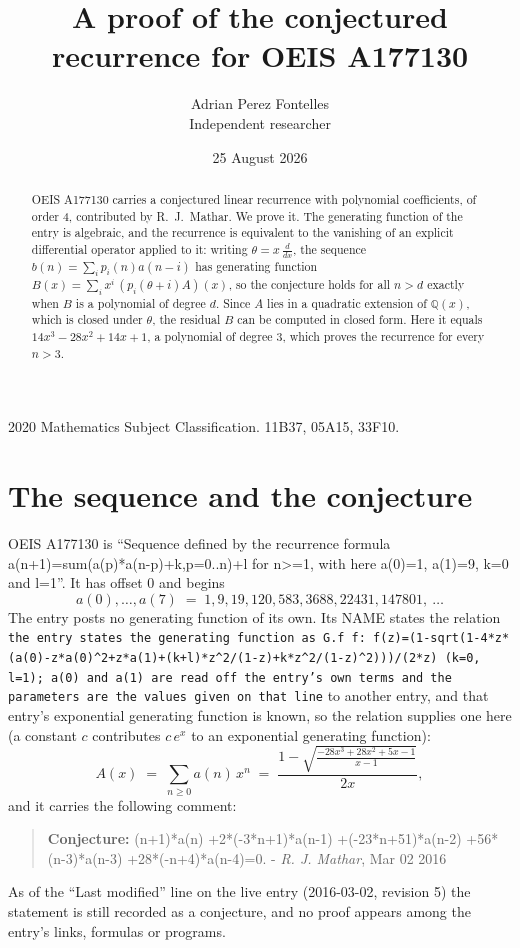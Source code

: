 \documentclass[11pt,a4paper]{article}
\title{A proof of the conjectured recurrence for OEIS A177130}
\author{Adrian Perez Fontelles\\ \small Independent researcher}
\date{25 August 2026}
\theoremstyle{plain}
\theoremstyle{definition}
\begin{document}
\maketitle

\begin{abstract}
OEIS A177130 carries a conjectured linear recurrence with polynomial coefficients, of
order 4, contributed by R.~J.~Mathar. We prove it. The generating function of the
entry is algebraic, and the recurrence is equivalent to the vanishing of an explicit
differential operator applied to it: writing $\theta=x\,\frac{d}{dx}$, the sequence
$b(n)=\sum_{i}p_{i}(n)a(n-i)$ has generating function
$B(x)=\sum_{i}x^{i}\,(p_{i}(\theta+i)A)(x)$, so the conjecture holds for all $n>d$ exactly
when $B$ is a polynomial of degree $d$. Since $A$ lies in a quadratic extension of
$\mathbb{Q}(x)$, which is closed under $\theta$, the residual $B$ can be computed in
closed form. Here it equals $14 x^{3} - 28 x^{2} + 14 x + 1$, a polynomial of degree $3$, which proves
the recurrence for every $n>3$.
\end{abstract}

\noindent\small 2020 Mathematics Subject Classification. 11B37, 05A15, 33F10.\normalsize

\section{The sequence and the conjecture}

OEIS A177130 is ``Sequence defined by the recurrence formula a(n+1)=sum(a(p)*a(n-p)+k,p=0..n)+l for n>=1, with here a(0)=1, a(1)=9, k=0 and l=1''. It has offset $0$ and begins
\[
a(0),\dots,a(7)\;=\;1, 9, 19, 120, 583, 3688, 22431, 147801,\ \dots
\]
The entry posts no generating function of its own. Its NAME states the
relation \texttt{the entry states the generating function as G.f f: f(z)=(1-sqrt(1-4*z*(a(0)-z*a(0)\textasciicircum{}2+z*a(1)+(k+l)*z\textasciicircum{}2/(1-z)+k*z\textasciicircum{}2/(1-z)\textasciicircum{}2)))/(2*z) (k=0, l=1); a(0) and a(1) are read off the entry's own terms and the parameters are the values given on that line} to another entry, and that entry's exponential generating
function is known, so the relation supplies one here (a constant $c$ contributes
$c\,e^{x}$ to an exponential generating function):
\begin{equation}\label{eq:gf}
A(x)\;=\;\sum_{n\ge 0} a(n)\,x^{n}\;=\;\frac{1 - \sqrt{\frac{- 28 x^{3} + 28 x^{2} + 5 x - 1}{x - 1}}}{2 x} ,
\end{equation}
and it carries the following comment:
\begin{quote}\small
\textbf{Conjecture:} (n+1)*a(n) +2*(-3*n+1)*a(n-1) +(-23*n+51)*a(n-2) +56*(n-3)*a(n-3) +28*(-n+4)*a(n-4)=0. - \emph{R. J. Mathar}, Mar 02 2016
\end{quote}
As of the ``Last modified'' line on the live entry (2016-03-02, revision 5) the
statement is still recorded as a conjecture, and no proof appears among the entry's links,
formulas or programs.
\end{document}
